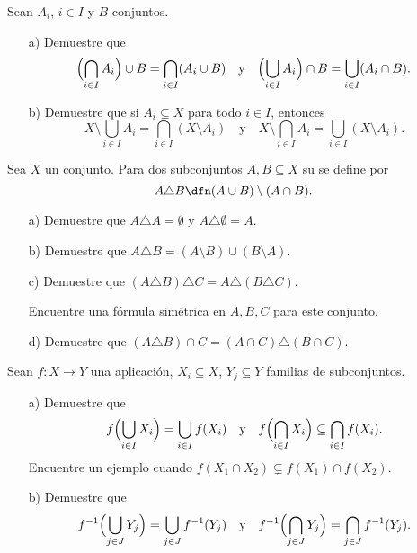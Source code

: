 \begin{ejercicio}
  Sean $A_i$, $i \in I$ y $B$ conjuntos.

  \begin{enumerate}
  \item[a)] Demuestre que
    \[ \Bigl(\bigcap_{i\in I} A_i\Bigr) \cup B = \bigcap_{i\in I} (A_i\cup B)
      \quad\text{y}\quad
      \Bigl(\bigcup_{i\in I} A_i\Bigr) \cap B = \bigcup_{i\in I} (A_i\cap B). \]

  \item[b)] Demuestre que si $A_i \subseteq X$ para todo $i \in I$, entonces
    \[ X \setminus \bigcup_{i\in I} A_i = \bigcap_{i\in I} (X\setminus A_i)
      \quad\text{y}\quad
      X \setminus \bigcap_{i\in I} A_i = \bigcup_{i\in I} (X\setminus A_i). \]
    \end{enumerate}
\end{ejercicio}

\begin{ejercicio}
  Sea $X$ un conjunto. Para dos subconjuntos $A, B \subseteq X$ su
   se define por
  $$A\triangle B \dfn ( A \cup B ) \setminus ( A \cap B ).$$

  \begin{enumerate}
  \item[a)] Demuestre que $A\triangle A = \emptyset$ y $A\triangle \emptyset = A$.

  \item[b)] Demuestre que $A\triangle B = (A \setminus B ) \cup (B \setminus A)$.

  \item[c)] Demuestre que $(A\triangle B)\triangle C = A\triangle (B\triangle C)$.

    Encuentre una fórmula simétrica en $A,B,C$ para este conjunto.

  \item[d)] Demuestre que $(A \triangle B) \cap C = (A \cap C) \triangle (B \cap C)$.
  \end{enumerate}
\end{ejercicio}

\begin{ejercicio}
  Sean $f\colon X\to Y$ una aplicación, $X_i \subseteq X$, $Y_j \subseteq Y$
  familias de subconjuntos.

  \begin{enumerate}
  \item[a)] Demuestre que
    \[ f \Bigl(\bigcup_{i\in I} X_i\Bigr) = \bigcup_{i\in I} f (X_i)
      \quad\text{y}\quad
      f \Bigl(\bigcap_{i\in I} X_i\Bigr) \subseteq \bigcap_{i\in I} f (X_i). \]
    Encuentre un ejemplo cuando $f (X_1\cap X_2) \subsetneq f (X_1) \cap f (X_2)$.

  \item[b)] Demuestre que
    \[ f^{-1} \Bigl(\bigcup_{j\in J} Y_j\Bigr) = \bigcup_{j\in J} f^{-1} (Y_j)
      \quad\text{y}\quad
      f^{-1} \Bigl(\bigcap_{j\in J} Y_j\Bigr) = \bigcap_{j\in J} f^{-1} (Y_j). \]
  \end{enumerate}
\end{ejercicio}

